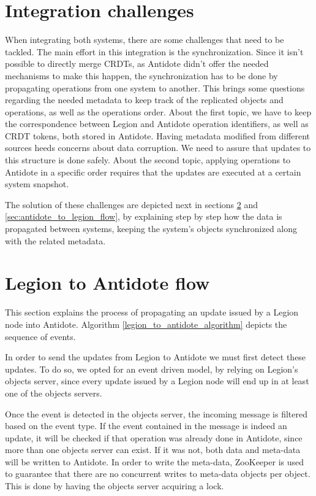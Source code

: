 \section{Integration challenges}
\label{sec:integration_challenges}
When integrating both systems, there are some challenges that need to be tackled. The main effort in this integration is the synchronization. Since it isn't possible to directly merge CRDTs, as Antidote didn't offer the needed mechanisms to make this happen, the synchronization has to be done by propagating operations from one system to another. This brings some questions regarding the needed metadata to keep track of the replicated objects and operations, as well as the operations order. About the first topic, we have to keep the correspondence between Legion and Antidote operation identifiers, as well as CRDT tokens, both stored in Antidote. Having metadata modified from different sources heeds concerns about data corruption. We need to assure that updates to this structure is done safely. About the second topic, applying operations to Antidote in a specific order requires that the updates are executed at a certain system snapshot.\par
	The solution of these challenges are depicted next in sections \ref{sec:legion_to_antidote_flow} and \ref{sec:antidote_to_legion_flow}, by explaining step by step how the data is propagated between systems, keeping the system's objects synchronized along with the related metadata.

\section{Legion to Antidote flow}
\label{sec:legion_to_antidote_flow}
This section explains the process of propagating an update issued by a Legion node into Antidote. Algorithm \ref{legion_to_antidote_algorithm} depicts the sequence of events.\par
	In order to send the updates from Legion to Antidote we must first detect these updates. To do so, we opted for an event driven model, by relying on Legion's objects server, since every update issued by a Legion node will end up in at least one of the objects servers.\par
	Once the event is detected in the objects server, the incoming message is filtered based on the event type. If the event contained in the message is indeed an update, it will be checked if that operation was already done in Antidote, since more than one objects server can exist. If it was not, both data and meta-data will be written to Antidote. In order to write the meta-data, ZooKeeper is used to guarantee that there are no concurrent writes to meta-data objects per object. This is done by having the objects server acquiring a lock.
	
